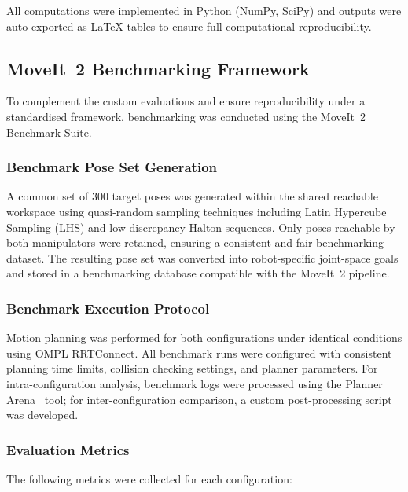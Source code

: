 \documentclass[conference]{IEEEtran}
\begin{document}
	All computations were implemented in Python (NumPy, SciPy) and outputs
	were auto-exported as \LaTeX{} tables to ensure full computational
	reproducibility.
	
	\subsection{MoveIt~2 Benchmarking Framework}
	
	To complement the custom evaluations and ensure reproducibility under
	a standardised framework, benchmarking was conducted using the
	MoveIt~2 Benchmark Suite.
	
	\subsubsection{Benchmark Pose Set Generation}
	
	A common set of 300 target poses was generated within the shared
	reachable workspace using quasi-random sampling techniques including
	Latin Hypercube Sampling (LHS) and low-discrepancy Halton sequences.
	Only poses reachable by both manipulators were retained, ensuring a
	consistent and fair benchmarking dataset. The resulting pose set was
	converted into robot-specific joint-space goals and stored in a
	benchmarking database compatible with the MoveIt~2 pipeline.
	
	\subsubsection{Benchmark Execution Protocol}
	
	Motion planning was performed for both configurations under identical
	conditions using OMPL RRTConnect. All benchmark runs were configured
	with consistent planning time limits, collision checking settings, and
	planner parameters. For intra-configuration analysis, benchmark logs
	were processed using the Planner Arena~\cite{plannerarena} tool; for
	inter-configuration comparison, a custom post-processing script was
	developed.
	
	\subsubsection{Evaluation Metrics}
	
	The following metrics were collected for each configuration:
	
\end{document}
